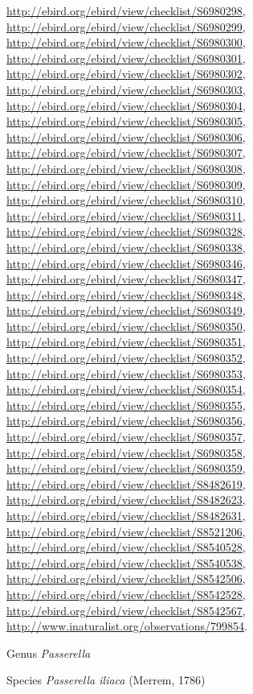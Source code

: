 \documentclass[9pt, article]{memoir}
\begin{document}
\begin{multicols}{2}
\url{http://ebird.org/ebird/view/checklist/S6980298}, 
\url{http://ebird.org/ebird/view/checklist/S6980299}, 
\url{http://ebird.org/ebird/view/checklist/S6980300}, 
\url{http://ebird.org/ebird/view/checklist/S6980301}, 
\url{http://ebird.org/ebird/view/checklist/S6980302}, 
\url{http://ebird.org/ebird/view/checklist/S6980303}, 
\url{http://ebird.org/ebird/view/checklist/S6980304}, 
\url{http://ebird.org/ebird/view/checklist/S6980305}, 
\url{http://ebird.org/ebird/view/checklist/S6980306}, 
\url{http://ebird.org/ebird/view/checklist/S6980307}, 
\url{http://ebird.org/ebird/view/checklist/S6980308}, 
\url{http://ebird.org/ebird/view/checklist/S6980309}, 
\url{http://ebird.org/ebird/view/checklist/S6980310}, 
\url{http://ebird.org/ebird/view/checklist/S6980311}, 
\url{http://ebird.org/ebird/view/checklist/S6980328}, 
\url{http://ebird.org/ebird/view/checklist/S6980338}, 
\url{http://ebird.org/ebird/view/checklist/S6980346}, 
\url{http://ebird.org/ebird/view/checklist/S6980347}, 
\url{http://ebird.org/ebird/view/checklist/S6980348}, 
\url{http://ebird.org/ebird/view/checklist/S6980349}, 
\url{http://ebird.org/ebird/view/checklist/S6980350}, 
\url{http://ebird.org/ebird/view/checklist/S6980351}, 
\url{http://ebird.org/ebird/view/checklist/S6980352}, 
\url{http://ebird.org/ebird/view/checklist/S6980353}, 
\url{http://ebird.org/ebird/view/checklist/S6980354}, 
\url{http://ebird.org/ebird/view/checklist/S6980355}, 
\url{http://ebird.org/ebird/view/checklist/S6980356}, 
\url{http://ebird.org/ebird/view/checklist/S6980357}, 
\url{http://ebird.org/ebird/view/checklist/S6980358}, 
\url{http://ebird.org/ebird/view/checklist/S6980359}, 
\url{http://ebird.org/ebird/view/checklist/S8482619}, 
\url{http://ebird.org/ebird/view/checklist/S8482623}, 
\url{http://ebird.org/ebird/view/checklist/S8482631}, 
\url{http://ebird.org/ebird/view/checklist/S8521206}, 
\url{http://ebird.org/ebird/view/checklist/S8540528}, 
\url{http://ebird.org/ebird/view/checklist/S8540538}, 
\url{http://ebird.org/ebird/view/checklist/S8542506}, 
\url{http://ebird.org/ebird/view/checklist/S8542528}, 
\url{http://ebird.org/ebird/view/checklist/S8542567}, 
\url{http://www.inaturalist.org/observations/799854}.

\vspace{6pt}\noindent\hspace{30pt}Genus \textit{Passerella}


\vspace{6pt}\noindent\hspace{36pt}Species \textit{Passerella iliaca} (Merrem, 1786)



\end{multicols}
\end{document}

